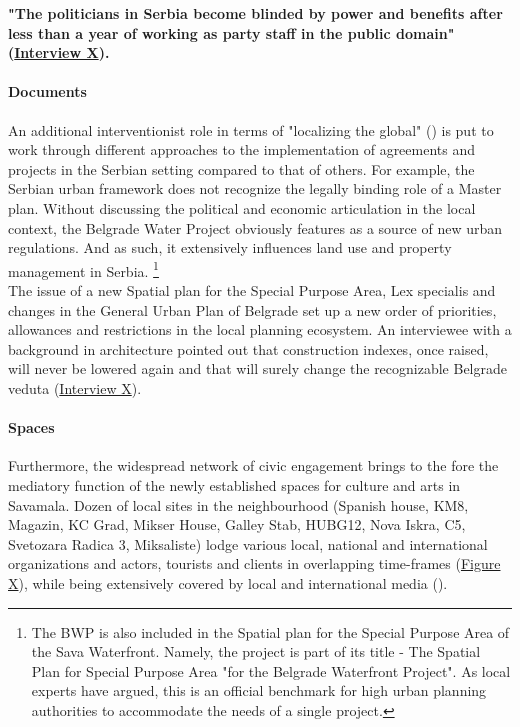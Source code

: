\documentclass[11pt]{report}
\begin{document}
\textbf{"The politicians in Serbia become blinded by power and benefits after less   than a year of working as party staff in the public domain" 
(\href{InterviewX}{Interview X}).}

\paragraph{Documents}

An additional interventionist role in terms of "localizing the global" (\href{Latour}{\citealt{latour_reassembling_2005}}) is put to work through different approaches to the implementation of agreements and projects in the Serbian setting compared to that of others. For example, the Serbian urban framework does not recognize the legally binding role of a Master plan. Without discussing the political and economic articulation in the local context, the Belgrade Water Project obviously features as a source of new urban regulations. And as such, it extensively influences land use and property management in Serbia.
\footnote
{The BWP is also included in the Spatial plan for the Special Purpose Area of the Sava Waterfront. Namely, the project is part of its title - The Spatial Plan for Special Purpose Area "for the Belgrade Waterfront Project". As local experts have argued, this is an official benchmark for high urban planning authorities to accommodate the needs of a single project.}
\\

The issue of a new Spatial plan for the Special Purpose Area, Lex specialis and changes in the General Urban Plan of Belgrade set up a new order of priorities, allowances and restrictions in the local planning ecosystem. An interviewee with a background in architecture pointed out that construction indexes, once raised, will never be lowered again and that will surely change the recognizable Belgrade veduta (\href{InterviewX}{Interview X}).

\paragraph{Spaces}

Furthermore, the widespread network of civic engagement brings to the fore the mediatory function of the newly established spaces for culture and arts in Savamala. Dozen of local sites in the neighbourhood (Spanish house, KM8, Magazin, KC Grad, Mikser House, Galley Stab, HUBG12, Nova Iskra, C5, Svetozara Radica 3, Miksaliste) lodge various local, national and international organizations and actors,  tourists  and clients in overlapping time-frames (\href{ref}{Figure X}),
while being extensively covered by local and international media
(\cite{add references from media sources archive}).
\\
\end{document}

